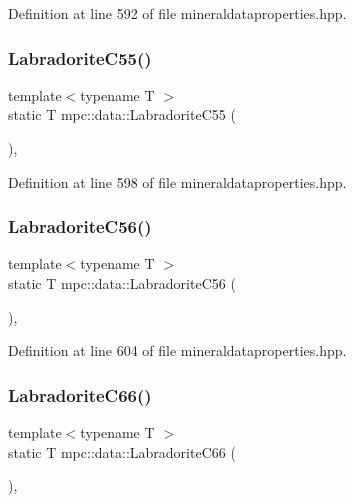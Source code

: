 Definition at line 592 of file mineraldataproperties.\+hpp.

\mbox{\label{namespacempc_1_1data_af0b90b3ba262d7ea9d975b1b8bceb02e}} 
\subsubsection{\texorpdfstring{Labradorite\+C55()}{LabradoriteC55()}}
{\footnotesize\ttfamily template$<$typename T $>$ \\
static T mpc\+::data\+::\+Labradorite\+C55 (\begin{DoxyParamCaption}{ }\end{DoxyParamCaption})\hspace{0.3cm}{\ttfamily [inline]}, {\ttfamily [static]}}



Definition at line 598 of file mineraldataproperties.\+hpp.

\mbox{\label{namespacempc_1_1data_a6378cd9512d26cc3ab606cd86188ba8c}} 
\subsubsection{\texorpdfstring{Labradorite\+C56()}{LabradoriteC56()}}
{\footnotesize\ttfamily template$<$typename T $>$ \\
static T mpc\+::data\+::\+Labradorite\+C56 (\begin{DoxyParamCaption}{ }\end{DoxyParamCaption})\hspace{0.3cm}{\ttfamily [inline]}, {\ttfamily [static]}}



Definition at line 604 of file mineraldataproperties.\+hpp.

\mbox{\label{namespacempc_1_1data_a087218da37a0b89a353d6301d142bc42}} 
\subsubsection{\texorpdfstring{Labradorite\+C66()}{LabradoriteC66()}}
{\footnotesize\ttfamily template$<$typename T $>$ \\
static T mpc\+::data\+::\+Labradorite\+C66 (\begin{DoxyParamCaption}{ }\end{DoxyParamCaption})\hspace{0.3cm}{\ttfamily [inline]}, {\ttfamily [static]}}



